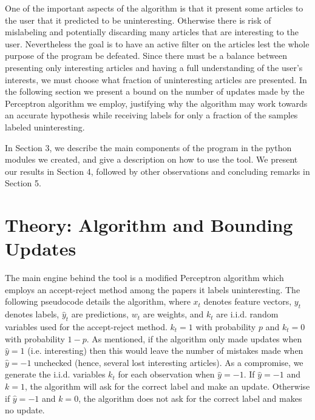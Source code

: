 \documentclass[12pt]{article}
\begin{document}
One of the important aspects of the algorithm is that it present some articles to the user that it predicted to be uninteresting. Otherwise there is risk of mislabeling and potentially discarding many articles that are interesting to the user. Nevertheless the goal is to have an active filter on the articles lest the whole purpose of the program be defeated. Since there must be a balance between presenting only interesting articles and having a full understanding of the user's interests, we must choose what fraction of uninteresting articles are presented. In the following section we present a bound on the number of updates made by the Perceptron algorithm we employ, justifying why the algorithm may work towards an accurate hypothesis while receiving labels for only a fraction of the samples labeled uninteresting.

In Section 3, we describe the main components of the program in the python modules we created, and give a description on how to use the tool. We present our results in Section 4, followed by other observations and concluding remarks in Section 5.



\section{Theory: Algorithm and Bounding Updates}
\label{sec:theory}
The main engine behind the tool is a modified Perceptron algorithm which employs an accept-reject method among the papers it labels uninteresting. The following pseudocode details the algorithm, where $x_t$ denotes feature vectors, $y_t$ denotes labels, $\widehat{y}_t$ are predictions, $w_t$ are weights, and $k_t$ are i.i.d. random variables used for the accept-reject method. $k_t = 1$ with probability $p$ and $k_t = 0$ with probability $1-p$. As mentioned, if the algorithm only made updates when $\widehat{y}=1$ (i.e. interesting) then this would leave the number of mistakes made when $\widehat{y} = -1$ unchecked (hence, several lost interesting articles). As a compromise, we generate the i.i.d. variables $k_t$ for each observation when $\widehat{y} = -1$. If $\widehat{y} = -1$ and $k=1$, the algorithm will ask for the correct label and make an update. Otherwise if $\widehat{y} = -1$ and $k=0$, the algorithm does not ask for the correct label and makes no update.\\
\end{document}
